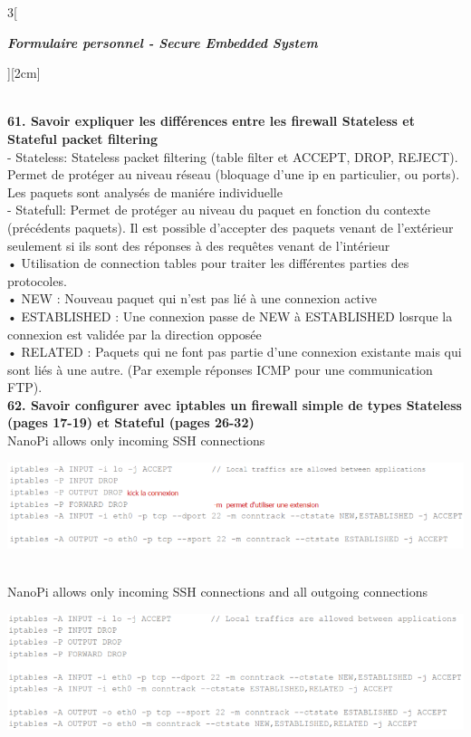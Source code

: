 \begin{multicols}{3}[\centerline{ \large\em \textbf{Formulaire personnel - Secure Embedded System}}][2cm]
\begin{minipage}{\linewidth}
\end{minipage}
\\ \textbf{61. Savoir expliquer les différences entre les firewall Stateless et Stateful packet filtering\\}
- Stateless: Stateless packet filtering (table filter et ACCEPT,
DROP, REJECT). Permet de protéger au niveau
réseau (bloquage d’une ip en particulier, ou ports).
Les paquets sont analysés de maniére individuelle \\
- Statefull:  Permet de protéger au
niveau du paquet en fonction du contexte (précédents
paquets). Il est possible d’accepter des paquets venant
de l’extérieur seulement si ils sont des réponses à des
requêtes venant de l’intérieur\\
• Utilisation de connection tables pour traiter les
différentes parties des protocoles.\\
• NEW : Nouveau paquet qui n’est pas lié à une
connexion active\\
• ESTABLISHED : Une connexion passe de NEW
à ESTABLISHED losrque la connexion est validée
par la direction opposée\\
• RELATED : Paquets qui ne font pas partie d’une
connexion existante mais qui sont liés à une autre.
(Par exemple réponses ICMP pour une communication FTP).\\
\textbf{62. Savoir configurer avec iptables un firewall simple de types Stateless (pages 17-19) et Stateful (pages 26-32)\\}
NanoPi allows only incoming SSH connections\\
\begin{minipage}{\linewidth}
	\centering
    \includegraphics[width =0.8\columnwidth]{images/43.png}
\end{minipage}\\
NanoPi allows only incoming SSH connections and all outgoing connections\\
\begin{minipage}{\linewidth}
	\centering
    \includegraphics[width =0.8\columnwidth]{images/44.png}

\end{minipage}
\end{multicols}
